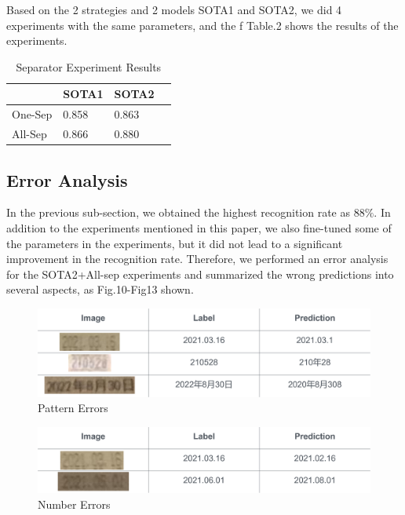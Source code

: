 \documentclass{article}
\begin{document}
Based on the 2 strategies and 2 models SOTA1 and SOTA2, we did 4 experiments with the same parameters, and the f Table.2 shows the results of the experiments. 

\begin{table}[]
\centering
\begin{tabular}{l|l|l|l}
        & SOTA1 & SOTA2 &   \\ \hline
One-Sep & 0.858 & 0.863 &   \\ \hline
All-Sep & 0.866 & 0.880 &   \\ 
\end{tabular}
\caption{Separator Experiment Results}
\label{Separator Experiments}
\end{table}

\subsection{Error Analysis}

In the previous sub-section, we obtained the highest recognition rate as $88\%$. In addition to the experiments mentioned in this paper, we also fine-tuned some of the parameters in the experiments, but it did not lead to a significant improvement in the recognition rate. Therefore, we performed an error analysis for the SOTA2+All-sep experiments and summarized the wrong predictions into several aspects, as Fig.10-Fig13 shown.

\begin{figure}[ht] \centering    
	\label{pattern errors}     
	\includegraphics[width=0.8\columnwidth]{pattern.png}
	\caption{Pattern Errors}
\end{figure}

\begin{figure}[ht] \centering    
	\label{number errors}     
	\includegraphics[width=0.8\columnwidth]{number.png}
	\caption{Number Errors}
\end{figure}
\end{document}
